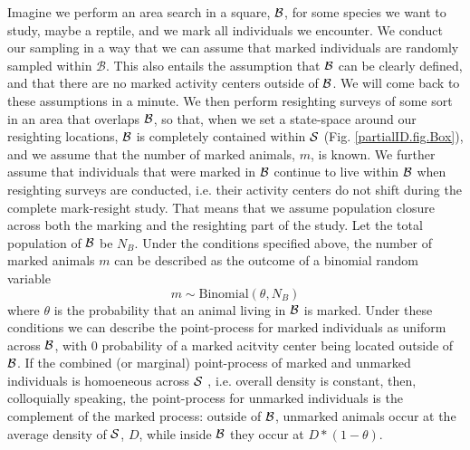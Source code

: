 Imagine we perform an area search in a square, ${\cal B}$, for some species we want to study, maybe a reptile, and we mark all individuals we encounter. We conduct our sampling in a way that we can assume that marked individuals are randomly
sampled within $\mathcal{B}$. 
This also entails the assumption that ${\cal B}$ can be clearly defined, and that there are no marked activity centers outside of ${\cal B}$. We will come back to these assumptions in a minute. We then perform resighting surveys of some sort in an area that overlaps ${\cal B}$, so that, when we set a state-space around our resighting locations, ${\cal B}$ is completely contained within ${\cal S}$ (Fig. \ref{partialID.fig.Box}), and we assume that the number of marked animals, $m$, is known. We further assume that individuals that were marked in ${\cal B}$ continue to live within ${\cal B}$ when resighting surveys are conducted, i.e. their activity centers do not shift during the complete mark-resight study. That means that we assume population closure across both the marking and the resighting part of the study. 
Let the total population of ${\cal B}$ be $N_B$. Under the conditions specified above, the number of marked animals $m$ can be described as the outcome of a binomial random variable
\[
m \sim \mbox{Binomial}(\theta, N_B)
\]
where $\theta$ is the probability that an animal living in ${\cal B}$ is marked. 
Under these conditions we can describe the point-process for marked individuals as uniform across ${\cal B}$, with 0 probability of a marked acitvity center being located outside of ${\cal B}$. If the combined (or marginal) point-process of marked and unmarked individuals is homoeneous across ${\cal S}$ , i.e. overall density is constant, then, colloquially speaking, the point-process for unmarked individuals is the complement of the marked process: outside of ${\cal B}$, unmarked animals occur at the average density of ${\cal S}$, $D$, while inside ${\cal B}$ they occur at $D * (1-\theta)$. 

